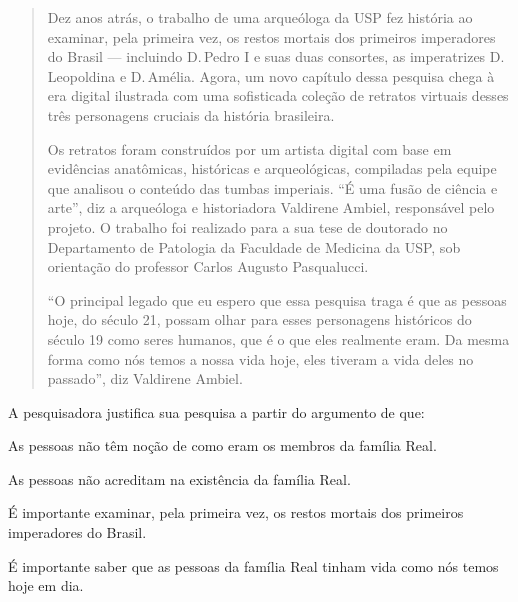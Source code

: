 \begin{quote}
\noindent Dez anos atrás, o trabalho de uma arqueóloga da USP fez história ao
examinar, pela primeira vez, os restos mortais dos primeiros imperadores
do Brasil — incluindo D.\,Pedro I e suas duas consortes, as
imperatrizes D.\,Leopoldina e D.\,Amélia. Agora, um novo capítulo dessa
pesquisa chega à era digital ilustrada com uma sofisticada coleção de
retratos virtuais desses três personagens cruciais da história
brasileira.

Os retratos foram construídos por um artista digital com base em
evidências anatômicas, históricas e arqueológicas, compiladas pela
equipe que analisou o conteúdo das tumbas imperiais. ``É uma fusão de
ciência e arte'', diz a arqueóloga e historiadora Valdirene Ambiel,
responsável pelo projeto. O trabalho foi realizado para a sua tese de
doutorado no Departamento de Patologia da Faculdade de Medicina da USP,
sob orientação do professor Carlos Augusto Pasqualucci.

``O principal legado que eu espero que essa pesquisa traga é que as
pessoas hoje, do século 21, possam olhar para esses personagens
históricos do século 19 como seres humanos, que é o que eles realmente
eram. Da mesma forma como nós temos a nossa vida hoje, eles tiveram a
vida deles no passado'', diz Valdirene Ambiel.

\end{quote}

\noindent A pesquisadora justifica sua pesquisa a partir do argumento de que:

\begin{escolha}
\item As pessoas não têm noção de como eram os membros da família Real.
\item As pessoas não acreditam na existência da família Real.
\item É importante examinar, pela primeira vez, os restos mortais dos
primeiros imperadores do Brasil.
\item É importante saber que as pessoas da família Real tinham vida como
nós temos hoje em dia.
\end{escolha}

